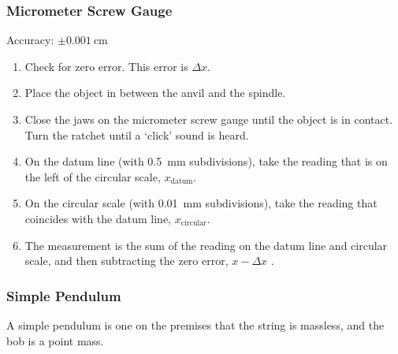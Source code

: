 \documentclass[../main.tex]{subfiles}
\begin{document}
		\subsubsection*{Micrometer Screw Gauge}
		Accuracy: \(\pm \SI{0.001}{\centi\meter}\)
		\begin{enumerate}
			\item Check for zero error. This error is \(\Delta x\).
			\item Place the object in between the anvil and the spindle.
			\item Close the jaws on the micrometer screw gauge until the object is in contact. Turn  the ratchet until a `click' sound is heard.
			\item On the datum line (with \SI{0.5}{\milli\meter} subdivisions), take the reading that is on the left of the circular scale, \(x_\mathrm{datum}\).
			\item On the circular scale (with \SI{0.01}{\milli\meter} subdivisions), take the reading that coincides with the datum line, \(x_\mathrm{circular}\).
			\item The measurement is the sum of the reading on the datum line and circular scale, and then subtracting the zero error, \(x-\Delta x\) .
		\end{enumerate}
	
		\subsubsection{Simple Pendulum}
		A simple pendulum is one on the premises that the string is massless, and the bob is a point mass.
		
\end{document}
